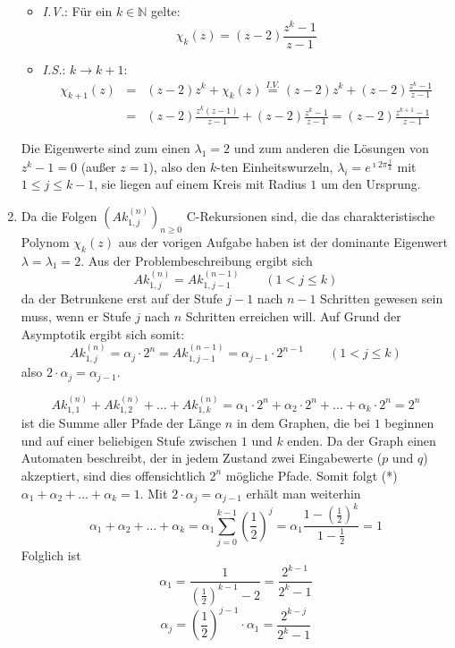 \begin{enumerate}
\begin{itemize}
		\item \textit{I.V.}: Für ein $k \in \mathbb{N}$ gelte:
			\[ \chi_k(z) = (z-2)\frac{z^k - 1}{z-1} \]
		\item \textit{I.S.}: $k \rightarrow k+1$:
			\begin{eqnarray*}
			\chi_{k+1}(z) &=& (z-2) z^{k} + \chi_k(z) \overset{I.V.}{=} (z-2) z^k + (z-2) \frac{z^k - 1}{z-1} \\
			   &=& (z-2) \frac{z^k (z-1)}{z-1} + (z-2)\frac{z^k - 1}{z-1} =
			   (z-2) \frac{z^{k+1} - 1}{z-1}
			\end{eqnarray*}
	\end{itemize}
	Die Eigenwerte sind zum einen $\lambda_1 = 2$ und zum anderen die Lösungen von $z^k - 1 = 0$ (außer $z = 1$), also den
	$k$-ten Einheitswurzeln, $\lambda_i = e^{\imath 2 \pi \frac{j}{k}}$ mit $1 \leq j \leq k-1$, sie liegen
	auf einem Kreis mit Radius $1$ um den Ursprung.

\item 
Da die Folgen $\left( Ak_{1,j}^{(n)} \right)_{n \geq 0}$ C-Rekursionen sind, die das charakteristische Polynom $\chi_k(z)$
aus der vorigen Aufgabe haben ist der dominante Eigenwert $\lambda = \lambda_1 = 2$.
Aus der Problembeschreibung ergibt sich 
\[ Ak_{1,j}^{(n)} = Ak_{1,j-1}^{(n-1)} \quad \quad (1 < j \leq k) \]
da der Betrunkene erst auf der Stufe $j-1$ nach $n-1$ Schritten gewesen sein muss, wenn er Stufe $j$ nach $n$ Schritten erreichen will.
Auf Grund der Asymptotik ergibt sich somit:
\[ Ak_{1,j}^{(n)} = \alpha_j \cdot 2^n = Ak_{1,j-1}^{(n-1)} = \alpha_{j-1} \cdot 2^{n-1} \quad \quad (1 < j \leq k) \]
also $2 \cdot \alpha_j = \alpha_{j-1}$.

\[ Ak_{1,1}^{(n)} + Ak_{1,2}^{(n)} + \ldots + Ak_{1,k}^{(n)} = \alpha_1 \cdot 2^n + \alpha_2 \cdot 2^n + \ldots + \alpha_k \cdot 2^n = 2^n \]
ist die Summe aller Pfade der Länge $n$ in dem Graphen, die bei $1$ beginnen und auf einer beliebigen Stufe zwischen $1$ und $k$ enden.
Da der Graph einen Automaten beschreibt, der in jedem Zustand zwei Eingabewerte ($p$ und $q$) akzeptiert, sind dies offensichtlich
$2^n$ mögliche Pfade.
Somit folgt (*) $\alpha_1 + \alpha_2 + \ldots + \alpha_k = 1$.
Mit $2 \cdot \alpha_j = \alpha_{j-1} $ erhält man weiterhin 
\[ \alpha_1 + \alpha_2 + \ldots + \alpha_k = \alpha_1 \sum_{j=0}^{k-1} \left( \frac{1}{2}\right)^j 
   = \alpha_1  \frac{1 - \left(\frac{1}{2}\right)^k}{1 - \frac{1}{2}}  = 1 \]
Folglich ist 
\[ \alpha_1 = \frac{1}{\left(\frac{1}{2}\right)^{k-1} - 2} = \frac{2^{k-1}}{2^k - 1} \]
\[ \alpha_j = \left(\frac{1}{2}\right)^{j-1} \cdot \alpha_1 = \frac{2^{k-j}}{2^k - 1}\]


\end{enumerate}
